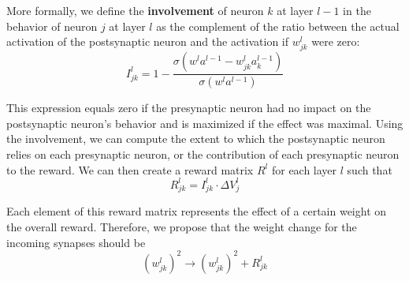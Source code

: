 \documentclass[12pt]{article}
\begin{document}
More formally, we define the \textbf{involvement} of neuron $k$ at layer $l-1$ in the behavior of neuron $j$ at layer $l$ as the complement of the ratio between the actual activation of the postsynaptic neuron and the activation if $w_{jk}^l$ were zero:
\begin{equation}
	I_{jk}^{l} = 1-\frac{\sigma\left(w^l a^{l-1} - w_{jk}^l a^{l-1}_k\right)}{\sigma\left(w^l a^{l-1}\right)}\label{eq4}
\end{equation}

This expression equals zero if the presynaptic neuron had no impact on the postsynaptic neuron's behavior and is maximized if the effect was maximal. Using the involvement, we can compute the extent to which the postsynaptic neuron relies on each presynaptic neuron, or the contribution of each presynaptic neuron to the reward. We can then create a reward matrix $R^l$ for each layer $l$ such that
\begin{equation}
	R_{jk}^l = I_{jk}^l \cdot\Delta V_j^l\label{eq5}
\end{equation}

Each element of this reward matrix represents the effect of a certain weight on the overall reward. Therefore, we propose that the weight change for the incoming synapses should be
\begin{equation}
	\left(w_{jk}^l\right)^2\rightarrow \left(w_{jk}^l\right)^2 + R_{jk}^l\label{eq6}
\end{equation}
\end{document}
